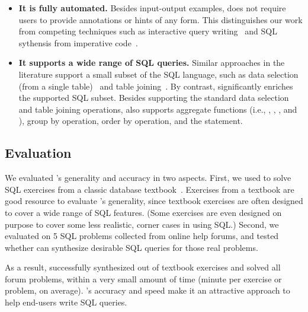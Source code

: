 \begin{itemize}
\item \textbf{It is fully automated.} Besides input-output
examples, \ourtool does not require users to provide
annotations or hints of any form. 
This distinguishes our work from competing techniques such as
interactive query writing~\cite{Zloof:1975} and
SQL sythensis from imperative code~\cite{abs-1208-2013}.

\item \textbf{It supports a wide range of SQL queries.}
Similar approaches in the literature support
a small subset of the SQL language, such as data selection
(from a single table)~\cite{Zloof:1975, DasSarma:2010}
and table joining~\cite{Tran:2009, DasSarma:2010, abs-1208-2013}. By contrast, 
\ourtool significantly enriches the supported SQL subset.
Besides supporting the standard data selection and table joining
operations, \ourtool also supports aggregate functions (i.e.,
, , ,
and ), group by operation,
order by operation, and the 
statement. 
\end{itemize}





\subsection{Evaluation}

We evaluated \ourtool's generality and accuracy
in two aspects. First, we used \ourtool to solve
\exnum SQL exercises from a classic database textbook~\cite{cowbook}. 
Exercises from a textbook are good resource
to evaluate \ourtool's generality, since textbook
exercises are often designed to cover a wide range of SQL features.
(Some exercises are even designed on purpose to cover some less realistic,
corner cases in using SQL.)
Second, we evaluated \ourtool on 5 SQL problems collected 
from online help forums, and tested whether
\ourtool can synthesize desirable SQL queries for those
real problems.  

As a result, \ourtool successfully synthesized \solexnum out of \exnum
textbook exercises and solved all \pnum forum problems, within a very
small amount of time (\avgtime minute per exercise or problem, on average).
\ourtool's accuracy and speed make it an attractive
approach to help end-users write SQL queries.

